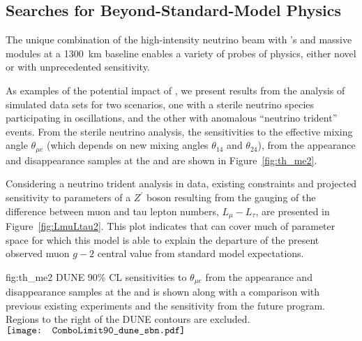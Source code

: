 \subsection{Searches for Beyond-Standard-Model Physics}


The unique combination of the high-intensity  neutrino beam with
's   and massive   modules at a 
\SI{1300}{\km} baseline enables a variety of probes of  
physics, either novel or with unprecedented sensitivity.

As examples of the potential impact of , we present results from the 
analysis of simulated data sets for two  scenarios, one with 
a sterile neutrino species participating in oscillations, 
and the other with anomalous ``neutrino trident'' events.
%
From the sterile neutrino analysis,  
the  sensitivities to the effective mixing angle $\theta_{\mu e}$
(which depends on new mixing angles $\theta_{14}$ and $\theta_{24}$), from the appearance and disappearance samples at the  and  are shown in Figure~\ref{fig:th_me2}. 
%

Considering a neutrino trident analysis in  data, 
existing constraints and projected sensitivity to parameters of a $Z^\prime$ boson resulting from the gauging of the difference between 
muon and tau lepton numbers, $L_\mu - L_\tau$, are presented 
in Figure~\ref{fig:LmuLtau2}.  This plot indicates that  
can cover much of parameter space for which this model is 
able to explain the 
departure of the present observed muon $g-2$ central value 
from standard model expectations.


\begin{dunefigure}
{fig:th_me2}
{DUNE 90\% CL sensitivities to $\theta_{\mu e}$ from the appearance and disappearance samples at the  and  is shown along with a comparison with previous existing experiments and the sensitivity from the future  program. Regions to the right of the DUNE contours are excluded.}
$\vcenter{\hbox{\texttt{[image: ComboLimit90\_dune\_sbn.pdf]}}}$
\end{dunefigure}

